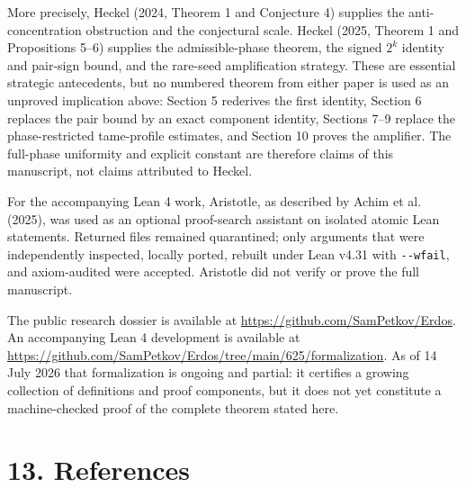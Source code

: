 \documentclass[
  11pt,
  a4paper,
]{article}
\begin{document}
More precisely, Heckel (2024, Theorem 1 and Conjecture 4) supplies the
anti-concentration obstruction and the conjectural scale. Heckel (2025,
Theorem 1 and Propositions 5--6) supplies the admissible-phase theorem,
the signed \(2^k\) identity and pair-sign bound, and the rare-seed
amplification strategy. These are essential strategic antecedents, but
no numbered theorem from either paper is used as an unproved implication
above: Section 5 rederives the first identity, Section 6 replaces the
pair bound by an exact component identity, Sections 7--9 replace the
phase-restricted tame-profile estimates, and Section 10 proves the
amplifier. The full-phase uniformity and explicit constant are therefore
claims of this manuscript, not claims attributed to Heckel.

For the accompanying Lean 4 work, Aristotle, as described by Achim et
al. (2025), was used as an optional proof-search assistant on isolated
atomic Lean statements. Returned files remained quarantined; only
arguments that were independently inspected, locally ported, rebuilt
under Lean v4.31 with \texttt{-\/-wfail}, and axiom-audited were
accepted. Aristotle did not verify or prove the full manuscript.

The public research dossier is available at
\url{https://github.com/SamPetkov/Erdos}. An accompanying Lean 4
development is available at
\url{https://github.com/SamPetkov/Erdos/tree/main/625/formalization}. As
of 14 July 2026 that formalization is ongoing and partial: it certifies
a growing collection of definitions and proof components, but it does
not yet constitute a machine-checked proof of the complete theorem
stated here.

\section{13. References}\label{references}
\end{document}

